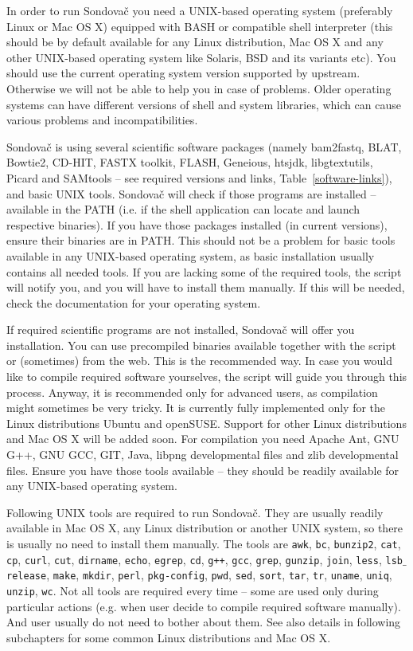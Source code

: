 \documentclass[a4paper, 11pt, twoside]{article}
\begin{document}
In order to run Sondovač you need a UNIX-based operating system (preferably Linux or Mac OS X) equipped with BASH or compatible shell interpreter (this should be by default available for any Linux distribution, Mac OS X and any other UNIX-based operating system like Solaris, BSD and its variants etc). You should use the current operating system version supported by upstream. Otherwise we will not be able to help you in case of problems. Older operating systems can have different versions of shell and system libraries, which can cause various problems and incompatibilities.

Sondovač is using several scientific software packages (namely bam2fastq, BLAT, Bowtie2, CD-HIT, FASTX toolkit, FLASH, Geneious, htsjdk, libgtextutils, Picard and SAMtools -- see required versions and links, Table~\ref{software-links}), and basic UNIX tools. Sondovač will check if those programs are installed -- available in the PATH (i.e. if the shell application can locate and launch respective binaries). If you have those packages installed (in current versions), ensure their binaries are in PATH. This should not be a problem for basic tools available in any UNIX-based operating system, as basic installation usually contains all needed tools. If you are lacking some of the required tools, the script will notify you, and you will have to install them manually. If this will be needed, check the documentation for your operating system.

If required scientific programs are not installed, Sondovač will offer you installation. You can use precompiled binaries available together with the script or (sometimes) from the web. This is the recommended way. In case you would like to compile required software yourselves, the script will guide you through this process. Anyway, it is recommended only for advanced users, as compilation might sometimes be very tricky. It is currently fully implemented only for the Linux distributions Ubuntu and openSUSE. Support for other Linux distributions and Mac OS X will be added soon. For compilation you need Apache Ant, GNU G++, GNU GCC, GIT, Java, libpng developmental files and zlib developmental files. Ensure you have those tools available -- they should be readily available for any UNIX-based operating system.

Following UNIX tools are required to run Sondovač. They are usually readily available in Mac OS X, any Linux distribution or another UNIX system, so there is usually no need to install them manually. The tools are \texttt{awk}, \texttt{bc}, \texttt{bunzip2}, \texttt{cat}, \texttt{cp}, \texttt{curl}, \texttt{cut}, \texttt{dirname}, \texttt{echo}, \texttt{egrep}, \texttt{cd}, \texttt{g++}, \texttt{gcc}, \texttt{grep}, \texttt{gunzip}, \texttt{join}, \texttt{less}, \texttt{lsb$\_$release}, \texttt{make}, \texttt{mkdir}, \texttt{perl}, \texttt{pkg-config}, \texttt{pwd}, \texttt{sed}, \texttt{sort}, \texttt{tar}, \texttt{tr}, \texttt{uname}, \texttt{uniq}, \texttt{unzip}, \texttt{wc}. Not all tools are required every time -- some are used only during particular actions (e.g. when user decide to compile required software manually). And user usually do not need to bother about them. See also details in following subchapters for some common Linux distributions and Mac OS X.
\end{document}
